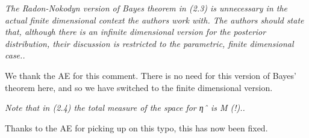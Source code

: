 \documentclass{article}
\newcommand{\comment}[2]{\vspace{0.6cm}{\bf Comment:} {\it #1.}

\vspace{0.3cm}{\bf Answer:} #2}
\begin{document}
\comment{The Radon-Nokodyn version of Bayes theorem in (2.3) is unnecessary in the actual finite dimensional context the authors work with. The authors should state that, although there is an infinite dimensional version for the posterior distribution, their discussion is restricted to the parametric, finite dimensional case.}{We thank the AE for this comment. There is no need for this version of Bayes' theorem here, and so we have switched to the finite dimensional version.}%

\comment{Note that in (2.4) the total measure of the space for ηˆ is M (!).}{Thanks to the AE for picking up on this typo, this has now been fixed.}%



\end{document}
